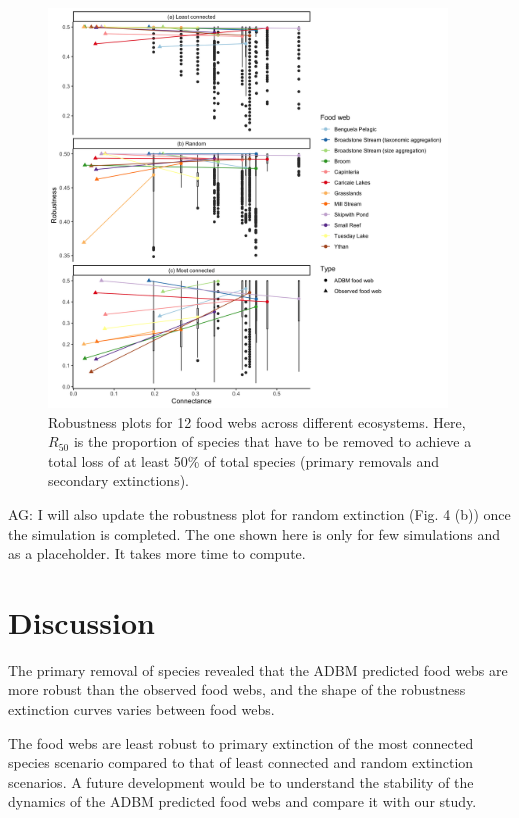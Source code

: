\documentclass{article}
\begin{document}
\begin{figure}

{\centering \includegraphics[width=400px]{../results/plot_robustness_all_uncertainty} 

}

\caption{\label{fig:fig_r4} Robustness plots for 12 food webs across different ecosystems. Here, $R_{50}$ is the proportion of species that have to be removed to achieve a total loss of at least 50\% of total species (primary removals and secondary extinctions).}\label{fig:unnamed-chunk-5}
\end{figure}

AG: I will also update the robustness plot for random extinction (Fig. 4
(b)) once the simulation is completed. The one shown here is only for
few simulations and as a placeholder. It takes more time to compute.

\hypertarget{discussion}{%
\section{Discussion}\label{discussion}}

The primary removal of species revealed that the ADBM predicted food
webs are more robust than the observed food webs, and the shape of the
robustness extinction curves varies between food webs.

The food webs are least robust to primary extinction of the most
connected species scenario compared to that of least connected and
random extinction scenarios. A future development would be to understand
the stability of the dynamics of the ADBM predicted food webs and
compare it with our study.
\end{document}
